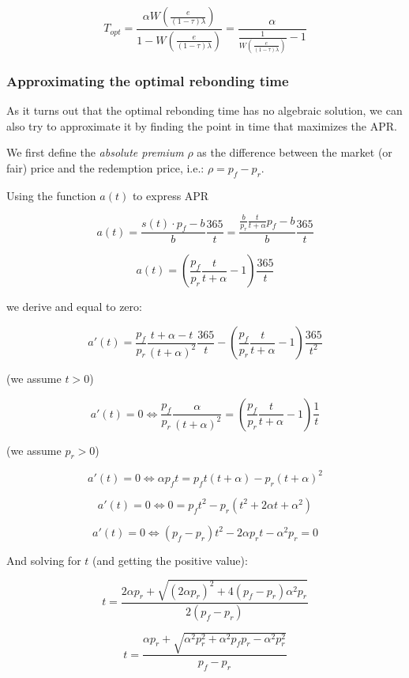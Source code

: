 \documentclass{article}
\begin{document}
\begin{equation}
  \label{eq:opt-rebonding-fee-premium}
T_{opt} = \frac{\alpha W\left(\frac{e}{(1-\tau)\lambda}\right)}{1 - W\left(\frac{e}{(1-\tau)\lambda}\right)} = \frac{\alpha}{\frac{1}{W\left(\frac{e}{(1-\tau)\lambda}\right)} - 1}
\end{equation}

\subsubsection{Approximating the optimal rebonding time}
As it turns out that the optimal rebonding time has no algebraic solution, we can also try to approximate it by finding the point in time that maximizes the APR.

We first define the \textit{absolute premium} $\rho$ as the difference between the market (or fair) price and the redemption price, i.e.: $\rho = p_f - p_r$.

Using the function $a(t)$ to express APR

\[
a(t) = \frac{s(t) \cdot p_f - b}{b} \frac{365}{t} = \frac{\frac{b}{p_r} \frac{t}{t+\alpha} p_f - b}{b} \frac{365}{t}
\]

\begin{equation}
  \label{eq:apr}
a(t) = \left(\frac{p_f}{p_r} \frac{t}{t+\alpha} - 1\right) \frac{365}{t}
\end{equation}

we derive and equal to zero:

\[
a'(t) = \frac{p_f}{p_r} \frac{t + \alpha - t}{(t+\alpha)^2} \frac{365}{t} - \left(\frac{p_f}{p_r} \frac{t}{t+\alpha} - 1\right) \frac{365}{t^2}
\]

(we assume $t > 0$)

\[
a'(t) = 0 \iff \frac{p_f}{p_r} \frac{\alpha}{(t+\alpha)^2} = \left(\frac{p_f}{p_r} \frac{t}{t+\alpha} - 1\right) \frac{1}{t}
\]

(we assume $p_r > 0$)

\[
a'(t) = 0 \iff \alpha p_f t = p_f t(t+\alpha)  - p_r(t+\alpha)^2
\]

\[
a'(t) = 0 \iff 0 = p_f t^2 - p_r(t^2+2\alpha t+\alpha^2)
\]

\[
a'(t) = 0 \iff (p_f-p_r)t^2  - 2\alpha p_r t - \alpha^2 p_r = 0
\]

And solving for $t$ (and getting the positive value):

\[
t = \frac{2\alpha p_r + \sqrt{(2\alpha p_r)^2 + 4(p_f-p_r) \alpha^2 p_r}}{2(p_f-p_r)}
\]

\[
t = \frac{\alpha p_r + \sqrt{\alpha^2 p_r^2 + \alpha^2 p_f p_r- \alpha^2 p_r^2}}{p_f-p_r}
\]
\end{document}
